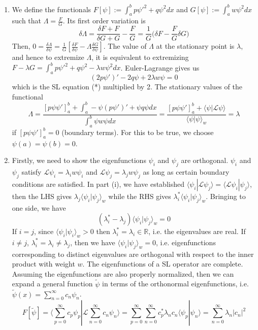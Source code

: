 \documentclass[a4paper]{article}
\begin{document}
\begin{ans}\leavevmode
\begin{enumerate}[label=(\roman*)]
\item We define the functionals $F[\psi]:=\int_a^bp\psi'^2+q\psi^2dx$ and $G[\psi]:=\int_a^bw\psi^2dx$ such that $\Lambda=\frac{F}{G}$. Its first order variation is 
$$\delta\Lambda=\frac{\delta F+F}{\delta G+G}-\frac{F}{G}=\frac{1}{G}\bigg(\delta F-\frac{F}{G}\delta G\bigg)$$
Then, $0=\frac{\delta\Lambda}{\delta\psi}=\frac{1}{G}[\frac{\delta F}{\delta\psi}-\Lambda\frac{\delta G}{\delta\psi}]$. The value of $\Lambda$ at the stationary point is $\lambda$, and hence to extremize $\Lambda$, it is equivalent to extremizing $F-\lambda G=\int_a^bp\psi'^2+q\psi^2-\lambda w\psi^2dx$. Euler-Lagrange gives us 
$$(2p\psi')'-2q\psi+2\lambda w\psi=0$$
which is the SL equation (*) multiplied by 2. The stationary values of the functional
$$\Lambda=\frac{[p\psi\psi']_a^b+\int_a^b-\psi(p\psi')'+\psi q\psi dx}{\int_a^b\psi w\psi dx}=\frac{[p\psi\psi']_a^b+\langle\psi|\mathcal{L}\psi\rangle}{\langle\psi|\psi\rangle_w}=\lambda$$
if $[p\psi\psi']_a^b=0$ (boundary terms). For this to be true, we choose $\psi(a)=\psi(b)=0$.\item Firstly, we need to show the eigenfunctions $\psi_i$ and $\psi_j$ are orthogonal. $\psi_i$ and $\psi_j$ satisfy $\mathcal{L}\psi_i=\lambda_iw\psi_i$ and $\mathcal{L}\psi_j=\lambda_jw\psi_j$ as long as certain boundary conditions are satisfied. In part (i), we have established $\langle\psi_i|\mathcal{L}\psi_j\rangle=\langle\mathcal{L}\psi_i|\psi_j\rangle$, then the LHS gives $\lambda_j\langle\psi_i|\psi_j\rangle_w$ while the RHS gives $\lambda_i^*\langle\psi_i|\psi_j\rangle_w$. Bringing to one side, we have
$$(\lambda_i^*-\lambda_j)\langle\psi_i|\psi_j\rangle_w=0$$
If $i=j$, since $\langle\psi_i|\psi_i\rangle_w>0$ then $\lambda_i^*=\lambda_i\in\mathbb{R}$, i.e. the eigenvalues are real. If $i\neq j$, $\lambda_i^*=\lambda_i\neq\lambda_j$, then we have $\langle\psi_i|\psi_j\rangle_w=0$, i.e. eigenfunctions corresponding to distinct eigenvalues are orthogonal with respect to the inner product with weight $w$. The eigenfunctions of a SL operator are complete. Assuming the eigenfunctions are also properly normalized, then we can expand a general function $\tilde{\psi}$ in terms of the orthonormal eigenfunctions, i.e. $\tilde{\psi}(x)=\sum_{n=0}^\infty c_n\psi_n$.
$$F[\tilde{\psi}]=\bigg\langle\sum_{p=0}^\infty c_p\psi_p|\mathcal{L}\sum_{n=0}^\infty c_n\psi_n\bigg\rangle=\sum_{p=0}^\infty\sum_{n=0}^\infty c_p^*\lambda_nc_n\langle\psi_p|\psi_n\rangle=\sum_{n=0}^\infty\lambda_n|c_n|^2$$

\end{enumerate}
\end{ans}
\end{document}
